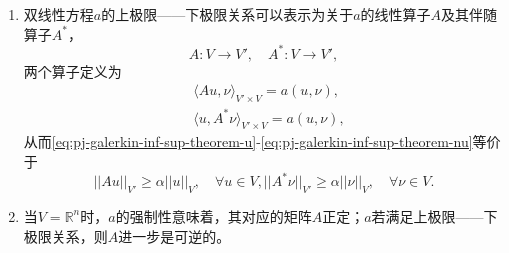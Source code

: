 \begin{subappendices}
\begin{enumerate}
\item 双线性方程$a$的上极限——下极限关系可以表示为关于$a$的线性算子$A$及其伴随算子$A^{*}$，
\begin{equation*}
  A:V \rightarrow V', \quad A^{*}: V \rightarrow V',
\end{equation*}
两个算子定义为
\begin{equation*}
  \begin{split}
    &\langle Au,\nu \rangle_{V' \times V} = a(u,\nu), \\
    &\langle u,A^{*} \nu \rangle_{V' \times V} = a(u,\nu),
  \end{split}
\end{equation*}
从而\eqref{eq:pj-galerkin-inf-sup-theorem-u}-\eqref{eq:pj-galerkin-inf-sup-theorem-nu}等价于
\begin{subequations}
  \label{eq:pj-galerkin-inf-sup-injection}
  \begin{equation}
    \label{eq:pj-galerkin-inf-sup-injection-A}
    ||A u||_{V'} \ge \alpha ||u||_{V}, \quad \forall u \in V,
  \end{equation}
  \begin{equation}
    \label{eq:pj-galerkin-inf-sup-injection-Astar}
    ||A^{*} \nu||_{V'} \ge \alpha ||\nu||_{V}, \quad \forall \nu \in V.
  \end{equation}
\end{subequations}

\item 当$V=\mathbb{R}^n$时，$a$的强制性意味着，其对应的矩阵$A$正定；$a$若满足上极限——下极限关系，则$A$进一步是可逆的。
\end{enumerate}


\end{subappendices}
